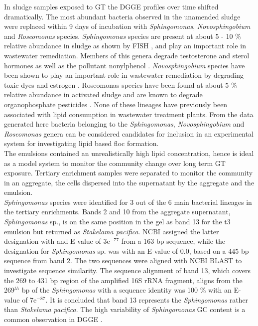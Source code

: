\documentclass[11pt]{article}
\begin{document}
In sludge samples exposed to GT the DGGE profiles over time shifted dramatically. The most abundant bacteria observed in the unamended sludge were replaced within 9 days of incubation with \emph{Sphingomonas}, \emph{Novosphingobium} and \emph{Roseomonas} species.
\emph{Sphingomonas} species are present at about 5 - 10 \% relative abundance in sludge as shown by FISH \cite{neef1999detection}, and play an important role in wastewater remediation. Members of this genera degrade testosterone and sterol hormones as well as the pollutant nonylphenol \cite{fujii2001sphingomonas,roh201017beta}. \emph{Novosphingobium} species have been shown to play an important role in wastewater remediation by degrading toxic dyes and estrogen \cite{addison2007novosphingobium,hashimoto2009contribution}.
Roseomonas species have been found at about 5 \% relative abundance in activated sludge and are known to degrade organophosphate pesticides \cite{jiang2008bacterial,jiang2006isolation}. None of these lineages have previously been associated with lipid consumption in wastewater treatment plants. From the data generated here bacteria belonging to the \emph{Sphingomonas}, \emph{Novosphingobium} and \emph{Roseomonas} genera can be considered candidates for inclusion in an experimental system for investigating lipid based floc formation. \\


The emulsions contained an unrealistically high lipid concentration, hence is ideal as a model system to monitor the community change over long term GT exposure.
Tertiary enrichment samples were separated to monitor the community in an aggregate, the cells dispersed into the supernatant by the aggregate and the emulsion. \\



\emph{Sphingomonas} species were identified for 3 out of the 6 main bacterial lineages in the tertiary enrichments. Bands 2 and 10 from the aggregate supernatant, \emph{Sphingomonas} sp., is on the same position in the gel as band 13 for the t3 emulsion but returned as \emph{Stakelama pacifica}.
NCBI assigned the latter designation with and E-value of 3e$^{-77}$ from a 163 bp sequence, while the designation for \emph{Sphingomonas} sp. was with an E-value of 0.0, based on a 445 bp sequence from band 2. The two sequences were aligned with NCBI BLAST to investigate sequence similarity. The sequence alignment of band 13, which covers the 269 to 431 bp region of the amplified 16S rRNA fragment, aligns from the 269$^{th}$ bp of the \emph{Sphingomonas} with a sequence identity was 100 \% with an E-value of 7e$^{-87}$. It is concluded that band 13 represents the \emph{Sphingomonas} rather than \emph{Stakelama pacifica}.
The high variability of \emph{Sphingomonas} GC content is a common observation in DGGE \cite{qiao2012effect}.\\
\end{document}
